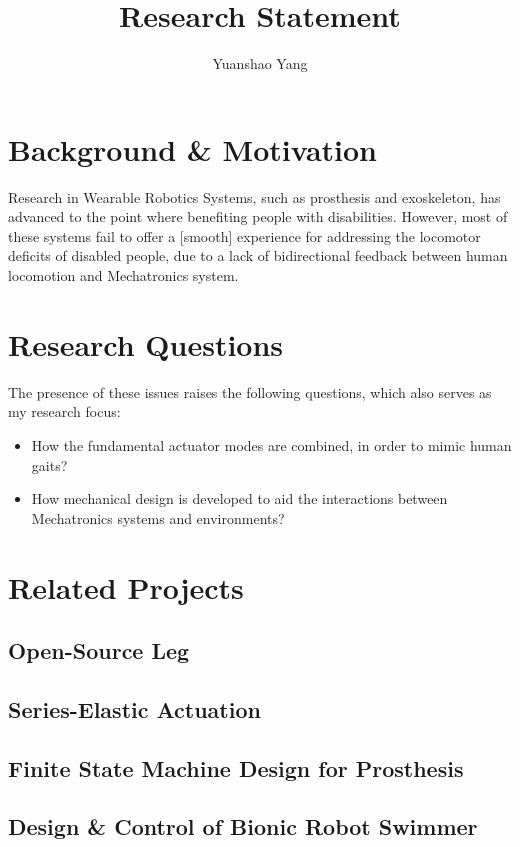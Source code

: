 \documentclass[12pt]{article}
\title{Research Statement}
\author{Yuanshao Yang}
\begin{document}
\maketitle


\section{Background \& Motivation}


Research in Wearable Robotics Systems, such as prosthesis and exoskeleton, has advanced to the point where benefiting people with disabilities. However, most of these systems fail to offer a [smooth] experience for addressing the locomotor deficits of disabled people, due to a lack of bidirectional feedback between human locomotion and Mechatronics system. 


\section{Research Questions}


The presence of these issues raises the following questions, which also serves as my research focus: 

\begin{itemize}
            
    \item {How the fundamental actuator modes are combined, in order to mimic human gaits?}
    \item {How mechanical design is developed to aid the interactions between Mechatronics systems and environments?}

\end{itemize}


\section{Related Projects}


    \subsection{Open-Source Leg}
        
        \subsection{Series-Elastic Actuation}
        \subsection{Finite State Machine Design for Prosthesis}

    \subsection{Design \& Control of Bionic Robot Swimmer} 




\end{document}
